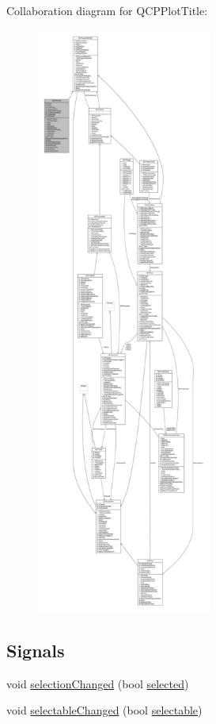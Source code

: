 Collaboration diagram for Q\+C\+P\+Plot\+Title\+:\nopagebreak
\begin{figure}[H]
\begin{center}
\leavevmode
\includegraphics[height=550pt]{class_q_c_p_plot_title__coll__graph}
\end{center}
\end{figure}
\subsection*{Signals}
\begin{DoxyCompactItemize}
\item 
void \hyperlink{class_q_c_p_plot_title_a3a01ede2da3b0b5eda33aa5274cc3523}{selection\+Changed} (bool \hyperlink{class_q_c_p_plot_title_a9771f3a4bca026484d7c8b5d953b5e82}{selected})
\item 
void \hyperlink{class_q_c_p_plot_title_a5eac3c17a4dbabb75250bc1210a83cfc}{selectable\+Changed} (bool \hyperlink{class_q_c_p_plot_title_a8d75c7cbcf2049c9512a3335d6f11416}{selectable})
\end{DoxyCompactItemize}
